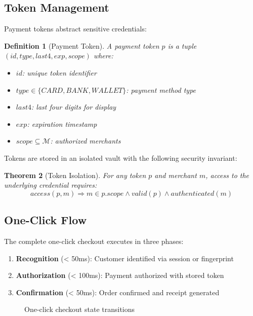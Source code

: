 \documentclass[11pt,a4paper]{article}
\newtheorem{theorem}{Theorem}[section]
\newtheorem{definition}[theorem]{Definition}
\begin{document}
\subsection{Token Management}

Payment tokens abstract sensitive credentials:

\begin{definition}[Payment Token]
A payment token $p$ is a tuple $(id, type, last4, exp, scope)$ where:
\begin{itemize}
    \item $id$: unique token identifier
    \item $type \in \{CARD, BANK, WALLET\}$: payment method type
    \item $last4$: last four digits for display
    \item $exp$: expiration timestamp
    \item $scope \subseteq \mathcal{M}$: authorized merchants
\end{itemize}
\end{definition}

Tokens are stored in an isolated vault with the following security invariant:

\begin{theorem}[Token Isolation]
For any token $p$ and merchant $m$, access to the underlying credential requires:
\[
access(p, m) \Rightarrow m \in p.scope \land valid(p) \land authenticated(m)
\]
\end{theorem}

\subsection{One-Click Flow}

The complete one-click checkout executes in three phases:

\begin{enumerate}
    \item \textbf{Recognition} (< 50ms): Customer identified via session or fingerprint
    \item \textbf{Authorization} (< 100ms): Payment authorized with stored token
    \item \textbf{Confirmation} (< 50ms): Order confirmed and receipt generated
\end{enumerate}

\begin{figure}[h]
\centering
{}
\caption{One-click checkout state transitions}
\end{figure}
\end{document}
